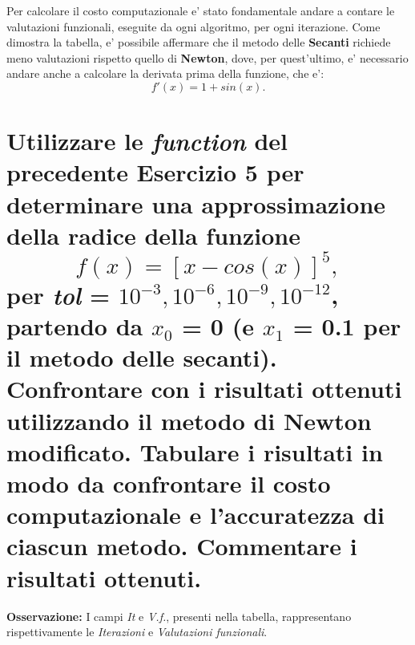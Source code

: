 \documentclass[10pt,a4paper]{article}
\begin{document}
Per calcolare il costo computazionale e' stato fondamentale andare a contare le valutazioni funzionali, eseguite da ogni algoritmo,
per ogni iterazione. Come dimostra la tabella, e' possibile affermare che il metodo delle \textbf{Secanti} richiede meno valutazioni
rispetto quello di \textbf{Newton}, dove, per quest'ultimo, e' necessario andare anche a calcolare la derivata prima della funzione, che e':
\[f'(x) = 1 + sin(x).\]

\section{Utilizzare le \textit{function} del precedente Esercizio 5 per determinare una approssimazione
della radice della funzione $$ f(x) = [x - cos(x)]^5, $$ per \textit{tol} = $ 10^{-3}, 10^{-6}, 10^{-9}, 10^{-12} $,
partendo da $ x_0 $ = 0 (e $ x_1 $ = 0.1 per il metodo delle secanti).
Confrontare con i risultati ottenuti utilizzando il metodo di Newton modificato.
Tabulare i risultati in modo da confrontare il costo computazionale e l'accuratezza
di ciascun metodo. Commentare i risultati ottenuti.}
\textbf{Osservazione:} I campi \textit{It} e \textit{V.f.}, presenti nella tabella, rappresentano rispettivamente
le \textit{Iterazioni} e \textit{Valutazioni funzionali}.
\end{document}
